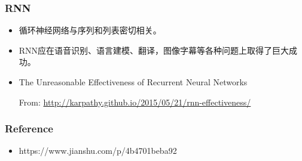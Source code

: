\begin{frame}[fragile]
  \frametitle{RNN}
  \begin{itemize}
  \item 循环神经网络与序列和列表密切相关。
  \item RNN应在语音识别、语言建模、翻译，图像字幕等各种问题上取得了巨大成功。
  \item The Unreasonable Effectiveness of Recurrent Neural Networks

    From: \url{http://karpathy.github.io/2015/05/21/rnn-effectiveness/}     
  \end{itemize}
\end{frame}


\begin{frame}[fragile]
  \frametitle{Reference}
  \begin{itemize}
  \item https://www.jianshu.com/p/4b4701beba92
  \end{itemize}
\end{frame}